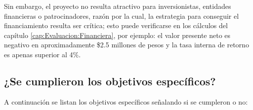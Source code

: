 Sin embargo, el proyecto no resulta atractivo para inversionistas, entidades financieras o patrocinadores, razón por la cual, la estrategia para conseguir el financiamiento resulta ser crítica; esto puede verificarse en los cálculos del capítulo \ref{cap:Evaluacion:Financiera}, por ejemplo: el valor presente neto es negativo en aproximadamente \$2.5 millones de pesos y la tasa interna de retorno es apenas superior al 4\%.


\subsection*{¿Se cumplieron los objetivos específicos?}

A continuación se listan los objetivos específicos señalando si se cumpleron o no:

